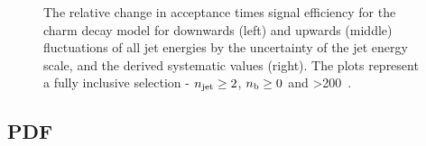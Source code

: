 \begin{figure}[ht!]
  \caption{The relative change in acceptance times signal efficiency for the
  charm decay model for downwards (left) and upwards (middle) fluctuations
  of all jet energies by the uncertainty of the jet energy scale, and the 
  derived systematic values (right). The plots represent a fully inclusive
  selection - $n_{\text{jet}} \geq 2$, $n_{\text{b}} \geq 0$ and \HT>200~\gev.}
  \label{fig:sms-jes-t2cc}
\end{figure}


\newpage
\subsection*{PDF}
\label{sec:t2cc_pdf_plots}


